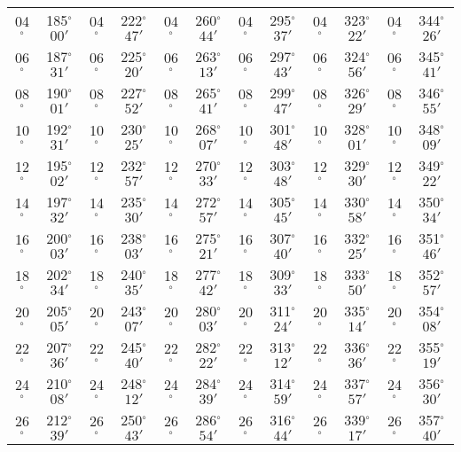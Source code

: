 \begin{table}
{\begin{tabular}{cc|cc|cc|cc|cc|cc}
04$^\circ$ & 185$^\circ$$00'$ & 04$^\circ$ & 222$^\circ$$47'$ & 04$^\circ$ & 260$^\circ$$44'$ & 04$^\circ$ & 295$^\circ$$37'$ &  04$^\circ$ & 323$^\circ$$22'$ & 04$^\circ$ & 344$^\circ$$26'$\\
06$^\circ$ & 187$^\circ$$31'$ & 06$^\circ$ & 225$^\circ$$20'$ & 06$^\circ$ & 263$^\circ$$13'$ & 06$^\circ$ & 297$^\circ$$43'$ &  06$^\circ$ & 324$^\circ$$56'$ & 06$^\circ$ & 345$^\circ$$41'$\\
08$^\circ$ & 190$^\circ$$01'$ & 08$^\circ$ & 227$^\circ$$52'$ & 08$^\circ$ & 265$^\circ$$41'$ & 08$^\circ$ & 299$^\circ$$47'$ &  08$^\circ$ & 326$^\circ$$29'$ & 08$^\circ$ & 346$^\circ$$55'$\\
10$^\circ$ & 192$^\circ$$31'$ & 10$^\circ$ & 230$^\circ$$25'$ & 10$^\circ$ & 268$^\circ$$07'$ & 10$^\circ$ & 301$^\circ$$48'$ &  10$^\circ$ & 328$^\circ$$01'$ & 10$^\circ$ & 348$^\circ$$09'$\\
12$^\circ$ & 195$^\circ$$02'$ & 12$^\circ$ & 232$^\circ$$57'$ & 12$^\circ$ & 270$^\circ$$33'$ & 12$^\circ$ & 303$^\circ$$48'$ &  12$^\circ$ & 329$^\circ$$30'$ & 12$^\circ$ & 349$^\circ$$22'$\\
14$^\circ$ & 197$^\circ$$32'$ & 14$^\circ$ & 235$^\circ$$30'$ & 14$^\circ$ & 272$^\circ$$57'$ & 14$^\circ$ & 305$^\circ$$45'$ &  14$^\circ$ & 330$^\circ$$58'$ & 14$^\circ$ & 350$^\circ$$34'$\\
16$^\circ$ & 200$^\circ$$03'$ & 16$^\circ$ & 238$^\circ$$03'$ & 16$^\circ$ & 275$^\circ$$21'$ & 16$^\circ$ & 307$^\circ$$40'$ &  16$^\circ$ & 332$^\circ$$25'$ & 16$^\circ$ & 351$^\circ$$46'$\\
18$^\circ$ & 202$^\circ$$34'$ & 18$^\circ$ & 240$^\circ$$35'$ & 18$^\circ$ & 277$^\circ$$42'$ & 18$^\circ$ & 309$^\circ$$33'$ &  18$^\circ$ & 333$^\circ$$50'$ & 18$^\circ$ & 352$^\circ$$57'$\\
20$^\circ$ & 205$^\circ$$05'$ & 20$^\circ$ & 243$^\circ$$07'$ & 20$^\circ$ & 280$^\circ$$03'$ & 20$^\circ$ & 311$^\circ$$24'$ &  20$^\circ$ & 335$^\circ$$14'$ & 20$^\circ$ & 354$^\circ$$08'$\\
22$^\circ$ & 207$^\circ$$36'$ & 22$^\circ$ & 245$^\circ$$40'$ & 22$^\circ$ & 282$^\circ$$22'$ & 22$^\circ$ & 313$^\circ$$12'$ &  22$^\circ$ & 336$^\circ$$36'$ & 22$^\circ$ & 355$^\circ$$19'$\\
24$^\circ$ & 210$^\circ$$08'$ & 24$^\circ$ & 248$^\circ$$12'$ & 24$^\circ$ & 284$^\circ$$39'$ & 24$^\circ$ & 314$^\circ$$59'$ &  24$^\circ$ & 337$^\circ$$57'$ & 24$^\circ$ & 356$^\circ$$30'$\\
26$^\circ$ & 212$^\circ$$39'$ & 26$^\circ$ & 250$^\circ$$43'$ & 26$^\circ$ & 286$^\circ$$54'$ & 26$^\circ$ & 316$^\circ$$44'$ &  26$^\circ$ & 339$^\circ$$17'$ & 26$^\circ$ & 357$^\circ$$40'$\\

\end{tabular}}
\end{table}
